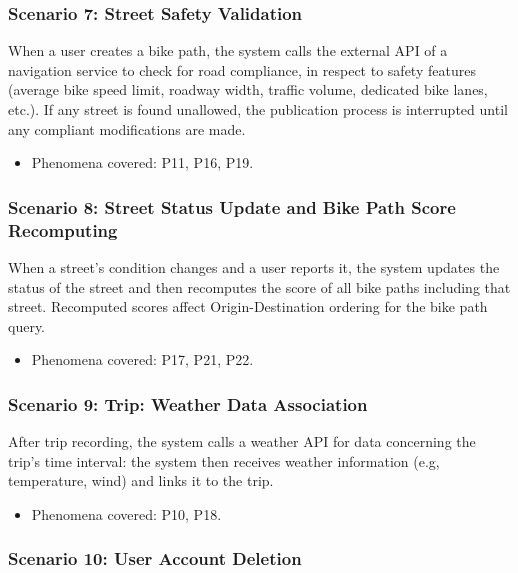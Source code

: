 \documentclass{Configuration_Files/PoliMi3i_thesis}
\begin{document}
    \subsubsection*{Scenario 7: Street Safety Validation}
    
    When a user creates a bike path, the system calls the external API of a navigation service to check for road compliance, in respect to safety features (average bike speed limit, roadway width, traffic volume, dedicated bike lanes, etc.). If any street is found unallowed, the publication process is interrupted until any compliant modifications are made.
    
    \begin{itemize}\item{Phenomena covered: P11, P16, P19.}\end{itemize}
    
    \subsubsection*{Scenario 8: Street Status Update and Bike Path Score Recomputing}
    
    When a street’s condition changes and a user reports it, the system updates the status of the street and then recomputes the score of all bike paths including that street. Recomputed scores affect Origin-Destination ordering for the bike path query.
    
    \begin{itemize}\item{Phenomena covered: P17, P21, P22.}\end{itemize}
    
    \subsubsection*{Scenario 9: Trip: Weather Data Association}
    
    After trip recording, the system calls a weather API for data concerning the trip's time interval: the system then receives weather information (e.g, temperature, wind) and links it to the trip.
    
    \begin{itemize}\item{Phenomena covered: P10, P18.}\end{itemize}
    
    \subsubsection*{Scenario 10: User Account Deletion}
    
\end{document}
